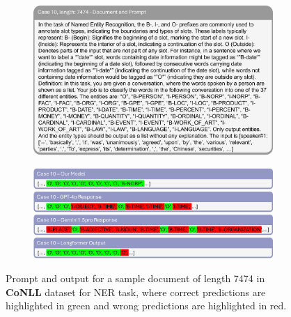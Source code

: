 \documentclass[11pt]{article}
\begin{document}
\begin{figure}[!h]
    \centering
    \begin{subfigure}[b]{1.0\linewidth}   
        \includegraphics[width=\textwidth]{images/case10_prompt.png} 
    \end{subfigure}
    \vspace{1pt}
    \begin{subfigure}[b]{1.0\linewidth}  
        \includegraphics[width=\textwidth]{images/case10_ans.png}
    \end{subfigure}
    \caption{Prompt and output for a sample document of length 7474 in \textbf{CoNLL} dataset for NER task, where correct predictions are highlighted in green and wrong predictions are highlighted in red.}
    \label{case10}
\end{figure}
\end{document}
